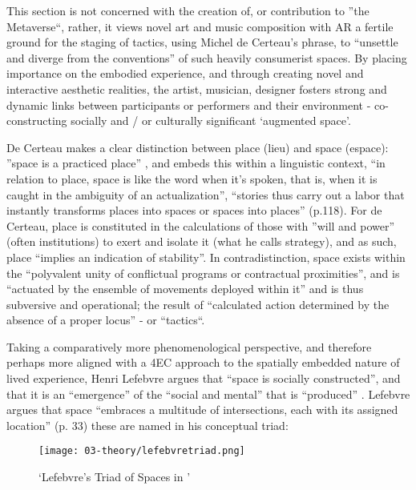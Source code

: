 This section is not concerned with the creation of, or contribution to ”the Metaverse“, rather, it views novel art and music composition with AR a fertile ground for the staging of tactics, using Michel de Certeau’s phrase, to “unsettle and diverge from the conventions” \citeyearpar[p. 36]{decerteau1984} of such heavily consumerist spaces. By placing importance on the embodied experience, and through creating novel and interactive aesthetic realities, the artist, musician, designer fosters strong and dynamic links between participants or performers and their environment - co-constructing socially and / or culturally significant ‘augmented space’.

De Certeau makes a clear distinction between place (lieu) and space (espace): ”space is a practiced place”  \citeyearpar[p. 117]{decerteau1984}, and embeds this within a linguistic context, “in relation to place, space is like the word when it’s spoken, that is, when it is caught in the ambiguity of an actualization”, “stories thus carry out a labor that instantly transforms places into spaces or spaces into places” (p.118). For de Certeau, place is constituted in the calculations of those with ”will and power” (often institutions) to exert and isolate it (what he calls strategy), and as such, place “implies an indication of stability”. In contradistinction, space exists within the “polyvalent unity of conflictual programs or contractual proximities”, and is “actuated by the ensemble of movements deployed within it” and is thus subversive and operational; the result of “calculated action determined by the absence of a proper locus” - or “tactics“. 

Taking a comparatively more phenomenological perspective, and therefore perhaps more aligned with a 4EC approach to the spatially embedded nature of lived experience, Henri Lefebvre argues that “space is socially constructed”, and that it is an “emergence” of the “social and mental” that is “produced”  \citeyearpar[p. 260]{lefebvre1991}. Lefebvre argues that space “embraces a multitude of intersections, each with its assigned location” (p. 33) these are named in his conceptual triad:

\begin{figure}[bth]
    \myfloatalign
    {\texttt{[image: 03-theory/lefebvretriad.png]}}
    \caption[`Lefebvre's Triad of Spaces in (Günzel, 2019, p.14)']{`Lefebvre's Triad of Spaces in \citep[p. 14]{gunzel2019}'}\label{fig: lefebvretriad}
\end{figure}

